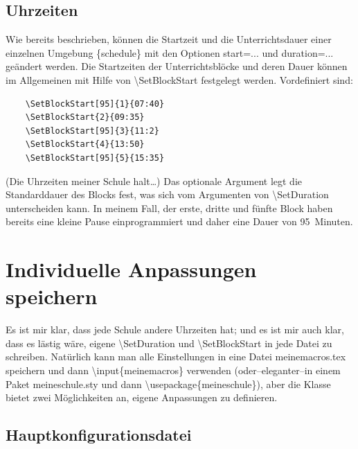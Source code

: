 \documentclass[hyperworksheet,pgfplots]{drcschool}
\newcommand*{\cs}[1]{\textup{\ttfamily\textbackslash#1}}                   %
\newcommand*{\opt}[1]{\textup{\ttfamily#1}}                                %
\newcommand*{\env}[1]{\textup{\ttfamily\{#1\}}}                            %
\begin{document}
\subsection{Uhrzeiten}
Wie bereits beschrieben, können die Startzeit und die Unterrichtsdauer
einer einzelnen Umgebung \env{schedule} mit den Optionen \opt{start=...}
und \opt{duration=...} geändert werden. Die Startzeiten der Unterrichtsblöcke
und deren Dauer können im Allgemeinen mit Hilfe von \cs{SetBlockStart}
festgelegt werden. Vordefiniert sind:
\begin{verbatim}
    \SetBlockStart[95]{1}{07:40}
    \SetBlockStart{2}{09:35}
    \SetBlockStart[95]{3}{11:2}
    \SetBlockStart{4}{13:50}
    \SetBlockStart[95]{5}{15:35}
\end{verbatim}
(Die Uhrzeiten meiner Schule halt\ldots) Das optionale Argument legt die
Standarddauer des Blocks fest, was sich vom Argumenten von \cs{SetDuration}
unterscheiden kann. In meinem Fall, der erste, dritte und fünfte Block haben
bereits eine kleine Pause einprogrammiert und daher eine Dauer von 95~Minuten.

\section{Individuelle Anpassungen speichern}\label{sec:anpassungen}
Es ist mir klar, dass jede Schule andere Uhrzeiten hat; und es ist mir auch klar,
dass es lästig wäre, eigene \cs{SetDuration} und \cs{SetBlockStart} in jede
Datei zu schreiben. Natürlich kann man alle Einstellungen in eine Datei \opt{meinemacros.tex}
speichern und dann \cs{input\{meinemacros\}} verwenden
(oder--eleganter--in einem Paket \opt{meineschule.sty} und dann \cs{usepackage\{meineschule\}}),
aber die Klasse bietet zwei
Möglichkeiten an, eigene Anpassungen zu definieren.

\subsection{Hauptkonfigurationsdatei}
\end{document}

